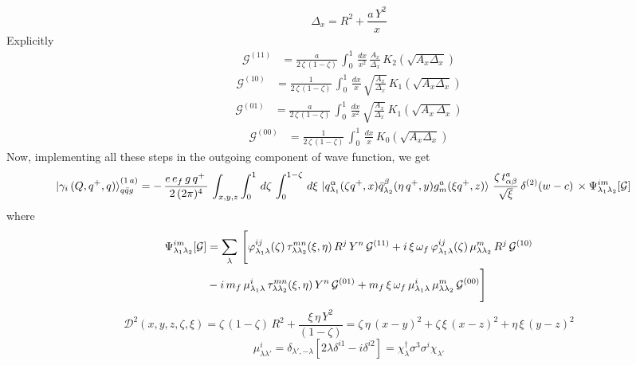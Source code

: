 \documentclass[9pt]{article}
\numberwithin{equation}{section}
\begin{document}
\begin{enumerate}
$$\Delta_{x} = R^{2} + \frac{a\,Y^{2}}{x}$$
Explicitly
\begin{align}
    \mathcal{G}^{(11)} & = \frac{a}{2\,\zeta\, (1-\zeta)}\, \int_{0}^{1}\, \frac{dx}{x^{2}}\, \frac{A_{x}}{\Delta_{x}}\,K_{2}\left(\sqrt{A_{x}\Delta_{x}}\right)
\end{align}
\begin{align}
    \mathcal{G}^{(10)} & = \frac{1}{2\, \zeta\, (1-\zeta)}\, \int_{0}^{1}\, \frac{dx}{x}\, \sqrt{\frac{A_{x}}{\Delta_{x}}}\, K_{1}\left(\sqrt{A_{x}\Delta_{x}}\right)
\end{align}
\begin{align}
     \mathcal{G}^{(01)} & = \frac{a}{2\, \zeta\, (1-\zeta)}\, \int_{0}^{1}\, \frac{dx}{x^{2}}\, \sqrt{\frac{A_{x}}{\Delta_{x}}}\, K_{1}\left(\sqrt{A_{x}\,\Delta_{x}}\right)
\end{align}
\begin{align}
     \mathcal{G}^{(00)} & = \frac{1}{2\, \zeta\, (1-\zeta)}\, \int_{0}^{1}\, \frac{dx}{x}\, K_{0}\left(\sqrt{A_{x}\Delta_{x}}\right)
\end{align}
Now, implementing all these steps in the outgoing component of wave function, we get
\begin{align}
    \ket{\gamma_{i}\,(Q,q^{+},q)}^{(1\,a)}_{q\Bar{q}g} &  = -\,\frac{e\,e_{f}\,g\,q^{+}\,}{2\,(2\pi)^{4}}\, \int_{x,y,z} \int_{0}^{1}\, d\zeta\, \int_{0}^{1-\zeta}\, d\xi\,\ket{q^{\alpha}_{\lambda_{1}}(\zeta q^{+},x)\Bar{q}^{\beta}_{\lambda_{2}}(\eta\,q^{+},y)g^{a}_{m}(\xi q^{+},z)}\, \frac{\zeta\, t^{a}_{\alpha\beta}}{\sqrt{\xi}}\, \delta^{(2)}(w-c)\,\times \Psi^{im}_{\lambda_{1}\lambda_{2}}[\mathcal{G}]
\end{align}
where 
\begin{align}
  \Psi^{im}_{\lambda_{1}\lambda_{2}}[\mathcal{G}] & = \sum_{\lambda}\, \Bigg[\varphi^{ij}_{\lambda_{1}\lambda}(\zeta)\,\tau^{mn}_{\lambda\lambda_{2}}(\xi,\eta)\,R^{j}\,Y^{n}\,\mathcal{G}^{(11)}+i\,\xi\,\omega_{f}\,\varphi^{ij}_{\lambda_{1}\lambda}(\zeta)\,\mu^{m}_{\lambda\lambda_{2}}\,R^{j}\,\mathcal{G}^{(10)}\notag \\ & -i\,m_{f}\,\mu^{i}_{\lambda_{1}\lambda}\,\tau^{mn}_{\lambda\lambda_{2}}(\xi,\eta)\,Y^{n}\,\mathcal{G}^{(01)} + m_{f}\,\xi\,\omega_{f}\,\mu^{i}_{\lambda_{1}\lambda}\,\mu^{m}_{\lambda\lambda_{2}}\,\mathcal{G}^{(00)}\Bigg]  
\end{align}
$$\mathcal{D}^{2}(x,y,z,\zeta,\xi) = \zeta\,(1-\zeta)\,R^{2} + \frac{\xi\,\eta\,Y^{2}}{(1-\zeta)} = \zeta\,\eta\,(x-y)^{2} + \zeta\,\xi\,(x-z)^{2} + \eta\,\xi\,(y-z)^{2}$$
$$\mu^{i}_{\lambda\lambda'} = \delta_{\lambda',-\lambda}\left[2\lambda\delta^{i1} - i\delta^{i2}\right] = \chi^{\dagger}_{\lambda}\sigma^{3}\sigma^{i}\chi_{\lambda'}$$

\end{enumerate}
\end{document}
